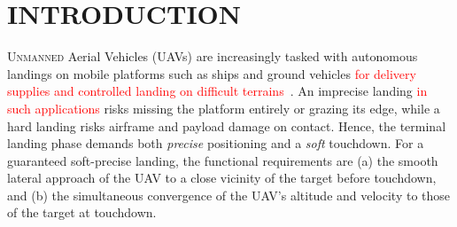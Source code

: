 \documentclass{IEEEtaes}
\newcommand{\new}[1]{\textcolor{red}{#1}}
\begin{document}

\section{INTRODUCTION} \label{intro: section}
U{\scshape nmanned} Aerial Vehicles (UAVs) are increasingly tasked with autonomous landings on mobile platforms such as ships and ground vehicles \new{for delivery supplies and controlled landing on difficult terrains}~\cite{lin2022, herisse2012, paris2020, bouazza2025, singhal2025}. An imprecise landing \new{in such applications} risks missing the platform entirely or grazing its edge, while a hard landing risks airframe and payload damage on contact. Hence, the terminal landing phase demands both \emph{precise} positioning and a \emph{soft} touchdown. For a guaranteed soft-precise landing, the functional requirements are (a) the smooth lateral approach of the UAV to a close vicinity of the target before touchdown, and (b) the simultaneous convergence of the UAV's altitude and velocity to those of the target at touchdown.
\end{document}

